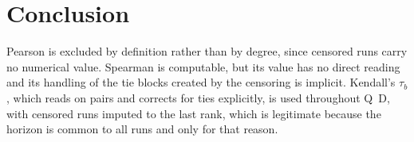 \documentclass[11pt,a4paper]{article}
\begin{document}
\section{Conclusion}

Pearson is excluded by definition rather than by degree, since censored runs carry no
numerical value. Spearman is computable, but its value has no direct reading and its handling of
the tie blocks created by the censoring is implicit. Kendall's $\tau_b$, which reads on pairs
and corrects for ties explicitly, is used throughout Q~D, with censored runs imputed to the last rank, which is legitimate
because the horizon is common to all runs and only for that reason.
\end{document}
